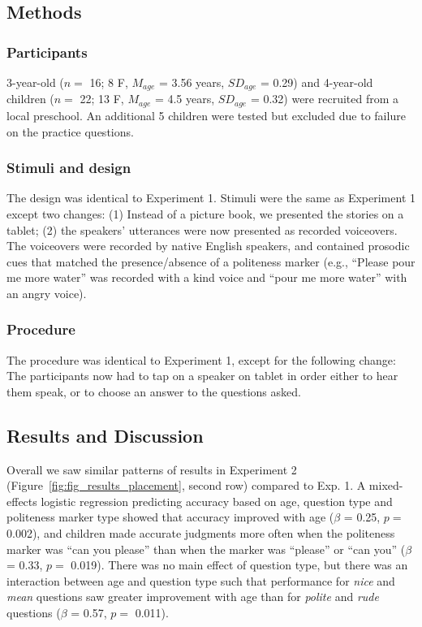 \documentclass[10pt, letterpaper]{article}
\begin{document}
\subsection{Methods}\label{methods-1}

\subsubsection{Participants}\label{participants-1}

3-year-old (\(n=\) 16; 8 F, \(M_{age}\) = 3.56 years, \(SD_{age}\) =
0.29) and 4-year-old children (\(n=\) 22; 13 F, \(M_{age}\) = 4.5 years,
\(SD_{age}\) = 0.32) were recruited from a local preschool. An
additional 5 children were tested but excluded due to failure on the
practice questions.

\subsubsection{Stimuli and design}\label{stimuli-and-design-1}

The design was identical to Experiment 1. Stimuli were the same as
Experiment 1 except two changes: (1) Instead of a picture book, we
presented the stories on a tablet; (2) the speakers' utterances were now
presented as recorded voiceovers. The voiceovers were recorded by native
English speakers, and contained prosodic cues that matched the
presence/absence of a politeness marker (e.g., ``Please pour me more
water'' was recorded with a kind voice and ``pour me more water'' with
an angry voice).

\subsubsection{Procedure}\label{procedure-1}

The procedure was identical to Experiment 1, except for the following
change: The participants now had to tap on a speaker on tablet in order
either to hear them speak, or to choose an answer to the questions
asked.

\subsection{Results and Discussion}\label{results-and-discussion-1}

Overall we saw similar patterns of results in Experiment 2
(Figure~\ref{fig:fig_results_placement}, second row) compared to Exp. 1.
A mixed-effects logistic regression predicting accuracy based on age,
question type and politeness marker type showed that accuracy improved
with age (\(\beta\) = 0.25, \(p =\) 0.002), and children made accurate
judgments more often when the politeness marker was ``can you please''
than when the marker was ``please'' or ``can you'' (\(\beta\) = 0.33,
\(p =\) 0.019). There was no main effect of question type, but there was
an interaction between age and question type such that performance for
\emph{nice} and \emph{mean} questions saw greater improvement with age
than for \emph{polite} and \emph{rude} questions (\(\beta\) = 0.57,
\(p =\) 0.011).
\end{document}
